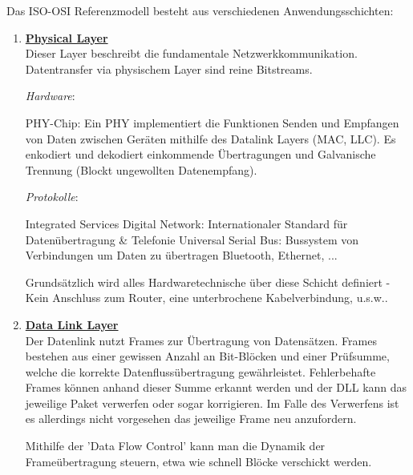 \documentclass[11pt]{article}
\begin{document}
    Das ISO-OSI Referenzmodell besteht aus verschiedenen Anwendungsschichten:
    \begin{enumerate}
        \item \textbf{\underline{Physical Layer}}\\
        Dieser Layer beschreibt die fundamentale Netzwerkkommunikation. Datentransfer via
        physischem Layer sind reine Bitstreams.

        \emph{Hardware}:
        \begin{addmargin}[1em]{1em}
            PHY-Chip: Ein PHY implementiert die Funktionen Senden und Empfangen von Daten zwischen
            Geräten mithilfe des Datalink Layers (MAC, LLC). Es enkodiert und dekodiert einkommende
            Übertragungen und Galvanische Trennung (Blockt ungewollten Datenempfang).
        \end{addmargin}

        \emph{Protokolle}:
        \begin{addmargin}[1em]{1em}
            Integrated Services Digital Network: Internationaler Standard für Datenübertragung \& Telefonie
            Universal Serial Bus: Bussystem von Verbindungen um Daten zu übertragen
            Bluetooth, Ethernet, ...
        \end{addmargin}

        Grundsätzlich wird alles Hardwaretechnische über diese Schicht definiert - Kein Anschluss zum Router,
        eine unterbrochene Kabelverbindung, u.s.w..

        \item \textbf{\underline{Data Link Layer}}\\
        Der Datenlink nutzt Frames zur Übertragung von Datensätzen. Frames bestehen aus einer gewissen Anzahl
        an Bit-Blöcken und einer Prüfsumme, welche die korrekte Datenflussübertragung gewährleistet.
        Fehlerbehafte Frames können anhand dieser Summe erkannt werden und der DLL kann das jeweilige Paket verwerfen
        oder sogar korrigieren.
        Im Falle des Verwerfens ist es allerdings nicht vorgesehen das jeweilige Frame neu anzufordern.

        Mithilfe der 'Data Flow Control' kann man die Dynamik der Frameübertragung steuern, etwa wie schnell
        Blöcke verschickt werden.


\end{enumerate}
\end{document}
